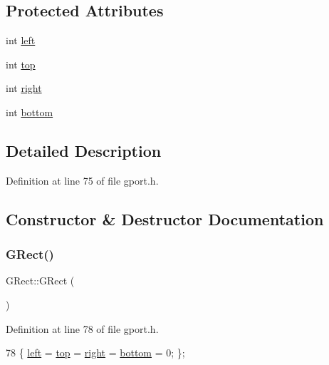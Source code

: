 \subsection*{Protected Attributes}
\begin{DoxyCompactItemize}
\item 
int \mbox{\hyperlink{class_g_rect_ab848c49d0c6376f749a592042791b98b}{left}}
\item 
int \mbox{\hyperlink{class_g_rect_af22c8a22a7d2fe0f139375e7eb171675}{top}}
\item 
int \mbox{\hyperlink{class_g_rect_a361868c6c368e642abcaf3e4823b1e70}{right}}
\item 
int \mbox{\hyperlink{class_g_rect_a767f1eb55f7e9880f58609406b2d6a66}{bottom}}
\end{DoxyCompactItemize}


\subsection{Detailed Description}


Definition at line 75 of file gport.\+h.



\subsection{Constructor \& Destructor Documentation}
\mbox{\label{class_g_rect_a66651711fd959d226869ba99a0a266c7}} 
\subsubsection{\texorpdfstring{G\+Rect()}{GRect()}\hspace{0.1cm}{\footnotesize\ttfamily [1/2]}}
{\footnotesize\ttfamily G\+Rect\+::\+G\+Rect (\begin{DoxyParamCaption}{ }\end{DoxyParamCaption})\hspace{0.3cm}{\ttfamily [inline]}}



Definition at line 78 of file gport.\+h.


\begin{DoxyCode}
78 \{ \mbox{\hyperlink{class_g_rect_ab848c49d0c6376f749a592042791b98b}{left}} = \mbox{\hyperlink{class_g_rect_af22c8a22a7d2fe0f139375e7eb171675}{top}} = \mbox{\hyperlink{class_g_rect_a361868c6c368e642abcaf3e4823b1e70}{right}} = \mbox{\hyperlink{class_g_rect_a767f1eb55f7e9880f58609406b2d6a66}{bottom}} = 0; \};
\end{DoxyCode}
\mbox{\label{class_g_rect_a56121bc9d4825b0f9200a78d29357b71}} 
